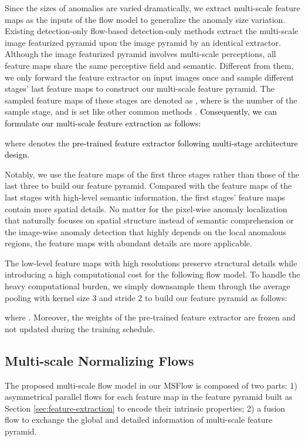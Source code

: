 \documentclass[lettersize,journal]{IEEEtran}
\newcommand{\roundb}[1]{\textcolor{black}{#1}}
\begin{document}
Since the sizes of anomalies are varied dramatically, we extract multi-scale feature maps as the inputs of the flow model to generalize the anomaly size variation.
Existing detection-only flow-based detection-only methods \cite{rudolph2021differnet,rudolph2022csflow} extract the multi-scale image featurized pyramid upon the image pyramid by an identical extractor. Although the image featurized pyramid involves multi-scale perceptions, all feature maps share the same perceptive field and semantic.
Different from them, we only forward the feature extractor on input images once and sample different stages' last feature maps to construct our multi-scale feature pyramid. The sampled feature maps of these stages are denoted as , where  is the number of the sample stage, and  is set  like other common methods \cite{gudovskiy2022cflow,rudolph2022csflow}.
\roundb{Consequently, we can formulate our multi-scale feature extraction as follows:}

where  denotes the \roundb{pre-trained feature extractor following multi-stage architecture design}.

Notably, we use the feature maps of the first three stages  rather than those of the last three \cite{gudovskiy2022cflow} to build our feature pyramid.
Compared with the feature maps of the last  stages with high-level semantic information, the first  stages' feature maps contain more spatial details. 
No matter for the pixel-wise anomaly localization that naturally focuses on spatial structure instead of semantic comprehension or the image-wise anomaly detection that highly depends on the local anomalous regions, the feature maps with abundant details are more applicable.

The low-level feature maps with high resolutions preserve structural details while introducing a high computational cost for the following flow model. To handle the heavy computational burden, we simply downsample them through the average pooling with kernel size 3 and stride 2 to build our feature pyramid  as follows:

where .
Moreover, the weights of the pre-trained feature extractor are frozen and not updated during the training schedule.


\subsection{Multi-scale Normalizing Flows}
The proposed multi-scale flow model in our MSFlow is composed of two parts: 
1) asymmetrical parallel flows for each feature map in the feature pyramid built as Section \ref{sec:feature-extraction} to encode their intrinsic properties;
2) a fusion flow to exchange the global and detailed information of multi-scale feature pyramid.
\end{document}
